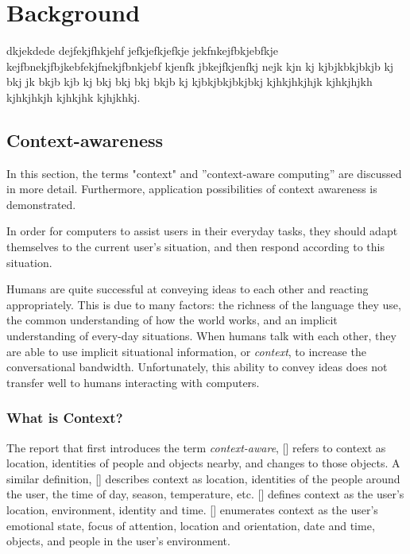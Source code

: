 \chapter{Background\label{cha:chapter2}}
dkjekdede dejfekjfhkjehf jefkjefkjefkje jekfnkejfbkjebfkje kejfbnekjfbjkebfekjfnekjfbnkjebf kjenfk jbkejfkjenfkj nejk kjn kj kjbjkbkjbkjb kj bkj jk bkjb kjb kj bkj bkj bkj bkjb kj  kjbkjbkjbkjbkj
kjhkjhkjhjk kjhkjhjkh kjhkjhkjh kjhkjhk kjhjkhkj.

\section{Context-awareness\label{sec:back_con_aw}}
In this section, the terms "context" and ''context-aware computing'' are discussed in more detail. Furthermore, application possibilities of context awareness is demonstrated.

In order for computers to assist users in their everyday tasks, they should adapt themselves to the current user's situation, and then respond according to this situation. 

Humans are quite successful at conveying ideas to each other and reacting appropriately. This is due to many factors: the richness of the language they use, the common understanding of how the world works, and an implicit understanding of every-day situations. When humans talk with each other, they are able to use implicit situational information, or \emph{context}, to increase the conversational bandwidth. Unfortunately, this ability to convey ideas does not transfer well to humans interacting with computers.\citeauthor{Dey2000b}

\subsection{What is Context?}

The report that first introduces the term \emph{context-aware}, [\citeauthor{ieee313011}] refers to context as location, identities of people and objects nearby, and changes to those objects. A similar definition, [\citeauthor{ieee626984}] describes context as location, identities of the people around the user, the time of day, season, temperature, etc. [\citeauthor{Ryan97}] defines context as the user's location, environment, identity and time. [\citeauthor{Dey98}] enumerates context as the user's emotional state, focus of attention, location and orientation, date and time, objects, and people in the user's environment. %

